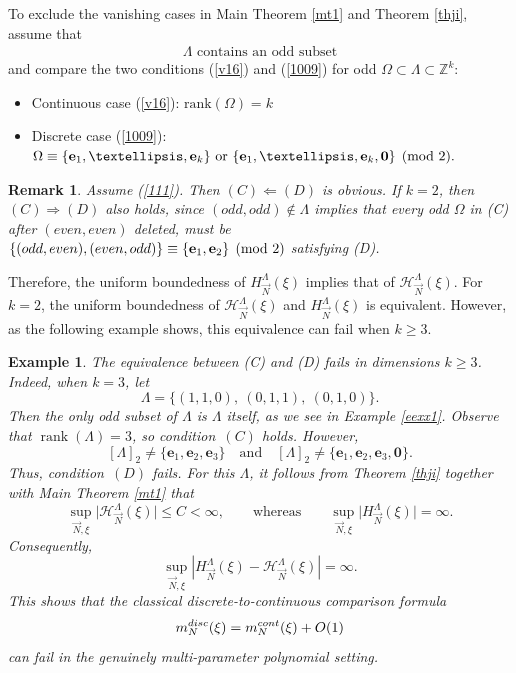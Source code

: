 \documentclass[10pt,a4paper]{amsart}
\newtheorem{remark}{Remark}\numberwithin{remark}{section}
\newtheorem{exam}{Example}\numberwithin{exam}{section}
\numberwithin{equation}{section}
\begin{document}
To exclude  the vanishing cases in Main Theorem \ref{mt1} and Theorem \ref{thji},  assume that
\begin{align}\label{111}
	\Lambda \text{ contains an odd subset}
\end{align}
and
compare the two conditions (\ref{v16}) and (\ref{1009}) for  odd   $\Omega\subset \Lambda\subset \mathbb{Z}^k$:
\begin{itemize}
	\item[(C)]  Continuous case (\ref{v16}):   $\text{rank}(\Omega)=k$ 
	\item[(D)] Discrete case (\ref{1009}):    $\Omega \equiv
	\{{\bf e}_1,\dots,{\bf e}_k\}\ \text{or}\ \{{\bf e}_1,\dots,{\bf e}_k, {\bf 0}\}
	\pmod 2.$
\end{itemize}
\begin{remark}\label{rk423}
	Assume   (\ref{111}). Then   $  (C)\Leftarrow  (D) $ is obvious.
	If $k=2$, then $ (C)\Rightarrow (D)$  also holds,  since  $(odd,odd)\notin \Lambda$ implies that  every odd $\Omega$ in  (C) after  $(even,even)$ deleted,  must be $\{(odd,even),(even,odd)\}  \equiv
	\{{\bf e}_1, {\bf e}_2\}
	\pmod 2 $ satisfying (D).  
\end{remark}
Therefore, the uniform boundedness of $H^{\Lambda}_{\vec{N}}(\xi)$ implies that of $\mathcal{H}^{\Lambda}_{\vec{N}}(\xi)$. 
For $k=2$, the uniform boundedness of $\mathcal{H}^{\Lambda}_{\vec{N}}(\xi)$ and $H^{\Lambda}_{\vec{N}}(\xi)$ is equivalent. 
However, as the following example shows, this equivalence can fail
when $k\ge 3$.
\begin{exam}
	The equivalence between {\rm(C)} and {\rm(D)} fails in dimensions
	$k\ge3$. Indeed, when $k=3$, let 
	\[
	\Lambda=\{(1,1,0),\ (0,1,1),\ (0,1,0)\}.
	\]
	Then the only odd subset of $\Lambda$ is $\Lambda$ itself, as we see in Example \ref{eexx1}. Observe that $\operatorname{rank}(\Lambda)=3$, so condition~$(C)$
	holds. However,
	\[
	[\Lambda]_2
	\neq
	\{\mathbf e_1,\mathbf e_2,\mathbf e_3\}
	\quad\text{and}\quad
	[\Lambda]_2
	\neq
	\{\mathbf e_1,\mathbf e_2,\mathbf e_3,\mathbf 0\}.
	\]
	Thus, condition~$(D)$ fails.
	For this $\Lambda$, it follows from Theorem \ref{thji} together with  Main Theorem \ref{mt1} that  
	\[
	\sup_{\vec{N},\xi} \bigl| \mathcal{H}^{\Lambda}_{\vec{N}}(\xi) \bigr| \le C < \infty, 
	\qquad\text{whereas}\qquad  \sup_{\vec{N},\xi} \bigl| H^{\Lambda}_{\vec{N}}(\xi) \bigr|=\infty.
	\]
	Consequently,
	\[
	\sup_{\vec N,\xi}
	\left|
	H^\Lambda_{\vec N}(\xi)
	-
	\mathcal H^\Lambda_{\vec N}(\xi)
	\right|
	=\infty.
	\]
	This shows that the classical discrete-to-continuous comparison formula
	\[
	m_N^{\rm disc}(\xi)
	=
	m_N^{\rm cont}(\xi)+O(1)
	\]
can	fail in the genuinely multi-parameter polynomial setting.
\end{exam}
\end{document}
